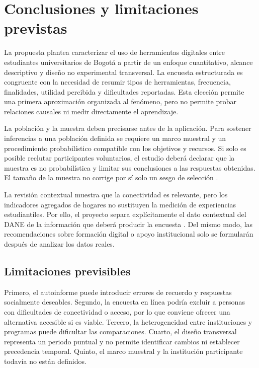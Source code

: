 \section{Conclusiones y limitaciones previstas}

La propuesta plantea caracterizar el uso de herramientas digitales entre estudiantes universitarios de Bogotá a partir de un enfoque cuantitativo, alcance descriptivo y diseño no experimental transversal. La encuesta estructurada es congruente con la necesidad de resumir tipos de herramientas, frecuencia, finalidades, utilidad percibida y dificultades reportadas. Esta elección permite una primera aproximación organizada al fenómeno, pero no permite probar relaciones causales ni medir directamente el aprendizaje.

La población y la muestra deben precisarse antes de la aplicación. Para sostener inferencias a una población definida se requiere un marco muestral y un procedimiento probabilístico compatible con los objetivos y recursos. Si solo es posible reclutar participantes voluntarios, el estudio deberá declarar que la muestra es no probabilística y limitar sus conclusiones a las respuestas obtenidas. El tamaño de la muestra no corrige por sí solo un sesgo de selección \parencite{argibay2009muestra}.

La revisión contextual muestra que la conectividad es relevante, pero los indicadores agregados de hogares no sustituyen la medición de experiencias estudiantiles. Por ello, el proyecto separa explícitamente el dato contextual del DANE de la información que deberá producir la encuesta \parencite{dane2025entic}. Del mismo modo, las recomendaciones sobre formación digital o apoyo institucional solo se formularán después de analizar los datos reales.

\subsection{Limitaciones previsibles}

Primero, el autoinforme puede introducir errores de recuerdo y respuestas socialmente deseables. Segundo, la encuesta en línea podría excluir a personas con dificultades de conectividad o acceso, por lo que conviene ofrecer una alternativa accesible si es viable. Tercero, la heterogeneidad entre instituciones y programas puede dificultar las comparaciones. Cuarto, el diseño transversal representa un periodo puntual y no permite identificar cambios ni establecer precedencia temporal. Quinto, el marco muestral y la institución participante todavía no están definidos.

